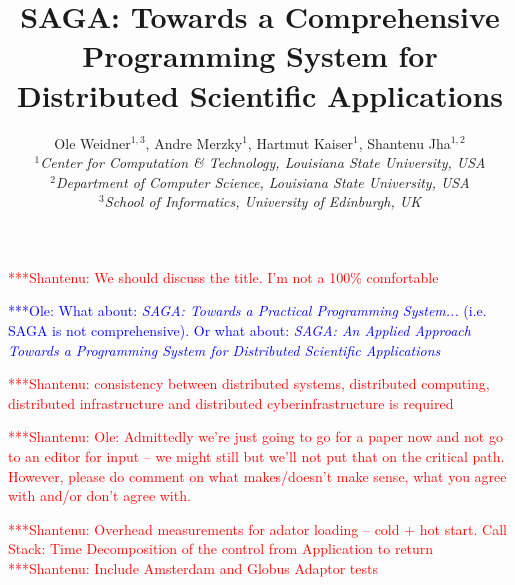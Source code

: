 \documentclass[a4paper,10pt]{article}
\newcommand{\jhanote}[1]{  {\textcolor{red}     { ***Shantenu: #1 }}}
\newcommand{\onote}[1]{  {\textcolor{blue}     { ***Ole: #1 }}}
\newcommand{\jhanote}[1]{}
\newcommand{\onote}[1]{}
\begin{document}
 \title{ \large \vspace{-3.5em} SAGA: Towards a Comprehensive
   Programming System for Distributed Scientific Applications }


 \author{\normalsize Ole Weidner$^{1,3}$, Andre Merzky$^{1}$, Hartmut Kaiser$^{1}$, Shantenu Jha$^{1,2}$\\
   \small{\emph{$^{1}$Center for Computation \& Technology, Louisiana State University, USA}}\\
   \small{\emph{$^{2}$Department of Computer Science, Louisiana State University, USA}}\\
   \small{\emph{$^{3}$School of Informatics, University of Edinburgh, UK}}\\
 }
 \date{}
 \maketitle
 




 
 \jhanote{We should discuss the title. I'm not a 100\% comfortable}
 
 \onote{What about: \textit{SAGA: Towards a Practical Programming System...} (i.e. SAGA is not 
 comprehensive). Or what about: \textit{SAGA: An Applied Approach Towards a
   Programming System for Distributed Scientific Applications}}

\jhanote{consistency between distributed systems, distributed
  computing, distributed infrastructure and distributed
  cyberinfrastructure is required}

\jhanote{Ole: Admittedly we're just going to go for a paper now and
  not go to an editor for input -- we might still but we'll not put
  that on the critical path. However, please do comment on what
  makes/doesn't make sense, what you agree with and/or don't agree
  with.}


\jhanote{Overhead measurements for adator loading -- cold + hot
  start. Call Stack: Time Decomposition of the control from
  Application to return} \jhanote{Include Amsterdam and Globus Adaptor
  tests}
\end{document}
